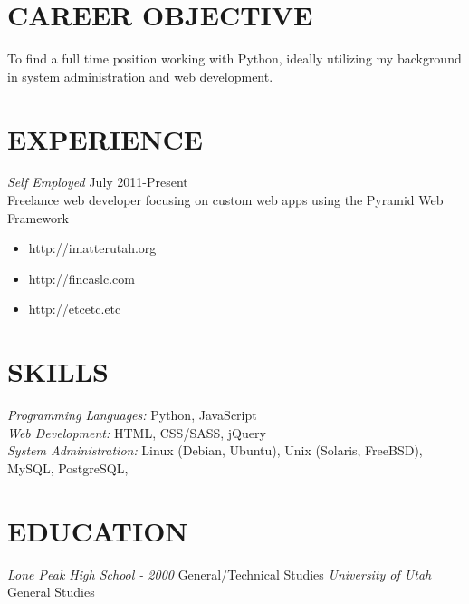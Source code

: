 \documentclass[line,margin]{res}
\begin{document}
\address{parker@parkerpinette.com \\ (801) 638-8611 \\ http://parkerpinette.com \\ https://github.com/ppinette}

\begin{resume}

\section{CAREER OBJECTIVE}To find a full time position working with Python, ideally utilizing my background in system administration and web development.

\section{EXPERIENCE} {\sl Self Employed} \hfill July 2011-Present \\
		Freelance web developer focusing on custom web apps using the Pyramid Web Framework
		\begin{itemize} \itemsep -2pt %
		\item http://imatterutah.org
		\item http://fincaslc.com
		\item http://etcetc.etc
		\end{itemize}


\section{SKILLS} {\sl Programming Languages:} \hfill Python, JavaScript\\
		{\sl Web Development:} HTML, CSS/SASS, jQuery\\
		{\sl System Administration:} Linux (Debian, Ubuntu), Unix (Solaris, FreeBSD), MySQL, PostgreSQL,
					

\section{EDUCATION} {\sl Lone Peak High School - 2000} General/Technical Studies
		{\sl University of Utah} General Studies



\end{resume}
\end{document}
